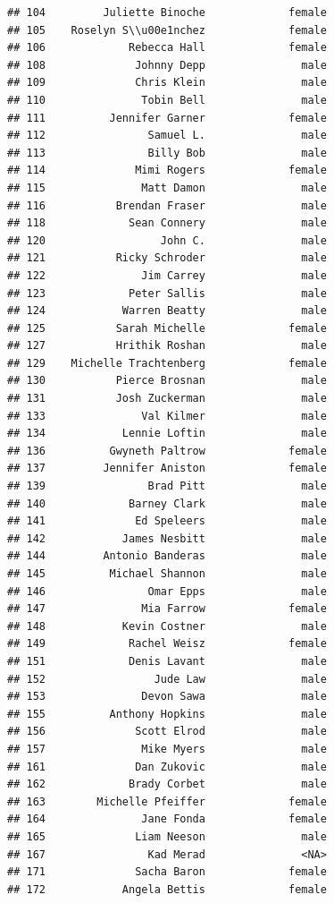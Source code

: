 \documentclass[
]{article}
\begin{document}
\begin{verbatim}
## 104         Juliette Binoche             female
## 105    Roselyn S\\u00e1nchez             female
## 106             Rebecca Hall             female
## 108              Johnny Depp               male
## 109              Chris Klein               male
## 110               Tobin Bell               male
## 111          Jennifer Garner             female
## 112                Samuel L.               male
## 113                Billy Bob               male
## 114              Mimi Rogers             female
## 115               Matt Damon               male
## 116           Brendan Fraser               male
## 118             Sean Connery               male
## 120                  John C.               male
## 121           Ricky Schroder               male
## 122               Jim Carrey               male
## 123             Peter Sallis               male
## 124            Warren Beatty               male
## 125           Sarah Michelle             female
## 127           Hrithik Roshan               male
## 129    Michelle Trachtenberg             female
## 130           Pierce Brosnan               male
## 131           Josh Zuckerman               male
## 133               Val Kilmer               male
## 134            Lennie Loftin               male
## 136          Gwyneth Paltrow             female
## 137         Jennifer Aniston             female
## 139                Brad Pitt               male
## 140             Barney Clark               male
## 141              Ed Speleers               male
## 142            James Nesbitt               male
## 144         Antonio Banderas               male
## 145          Michael Shannon               male
## 146                Omar Epps               male
## 147               Mia Farrow             female
## 148            Kevin Costner               male
## 149             Rachel Weisz             female
## 151             Denis Lavant               male
## 152                 Jude Law               male
## 153               Devon Sawa               male
## 155          Anthony Hopkins               male
## 156              Scott Elrod               male
## 157               Mike Myers               male
## 161              Dan Zukovic               male
## 162             Brady Corbet               male
## 163        Michelle Pfeiffer             female
## 164               Jane Fonda             female
## 165              Liam Neeson               male
## 167                Kad Merad               <NA>
## 171              Sacha Baron             female
## 172            Angela Bettis             female

\end{verbatim}
\end{document}
